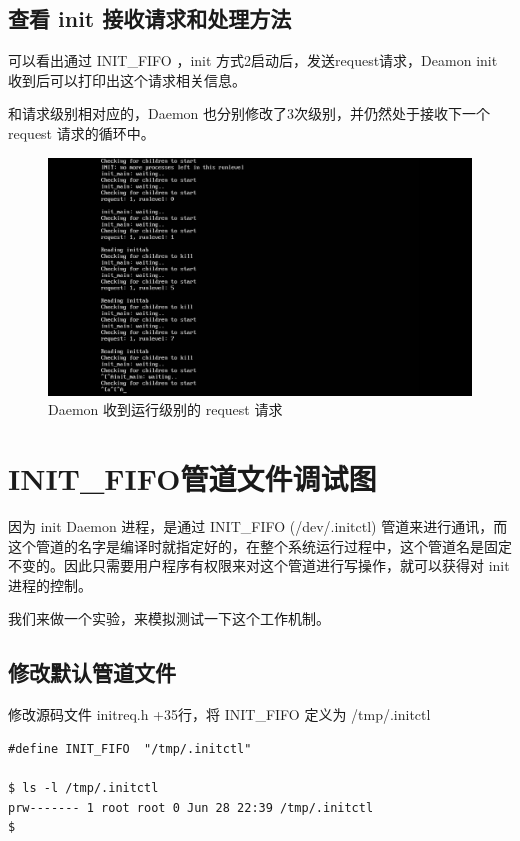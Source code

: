 \subsection{查看 init 接收请求和处理方法}

可以看出通过 INIT\_FIFO ，init 方式2启动后，发送request请求，Deamon init
收到后可以打印出这个请求相关信息。

和请求级别相对应的，Daemon 也分别修改了3次级别，并仍然处于接收下一个
request 请求的循环中。

\begin{figure}[htbp]
\centering
\includegraphics{./pictures/init-daemon-trans.png}
\caption{Daemon 收到运行级别的 request 请求}
\end{figure}

\section{INIT\_FIFO管道文件调试图}

因为 init Daemon 进程，是通过 INIT\_FIFO (/dev/.initctl)
管道来进行通讯，而这个管道的名字是编译时就指定好的，在整个系统运行过程中，这个管道名是固定不变的。因此只需要用户程序有权限来对这个管道进行写操作，就可以获得对
init 进程的控制。

我们来做一个实验，来模拟测试一下这个工作机制。

\subsection{修改默认管道文件}

修改源码文件 initreq.h +35行，将 INIT\_FIFO 定义为 /tmp/.initctl

{\begin{shaded}\begin{verbatim}
#define INIT_FIFO  "/tmp/.initctl"

$ ls -l /tmp/.initctl 
prw------- 1 root root 0 Jun 28 22:39 /tmp/.initctl
$ 
\end{verbatim}\end{shaded}}
